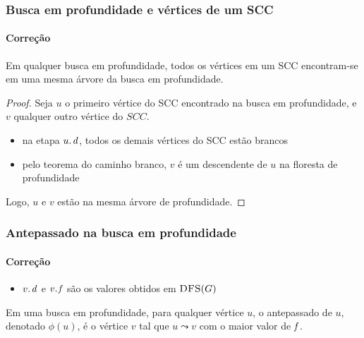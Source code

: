 \documentclass{beamer}
\begin{document}

\begin{frame}
\frametitle{Busca em profundidade e vértices de um SCC}
\framesubtitle{Correção}

\begin{theorem}
Em qualquer busca em profundidade, todos os vértices em um SCC
encontram-se em uma mesma árvore da busca em profundidade.
\end{theorem}
\pause
\begin{proof}
Seja $u$ o primeiro vértice do SCC encontrado na busca em profundidade,
e $v$ qualquer outro vértice do $SCC$.
\begin{itemize}
\item na etapa $\attrib{u}{d}$, todos os demais vértices do SCC estão brancos
\item pelo teorema do caminho branco, $v$ é um descendente de $u$ na floresta
de profundidade
\end{itemize}
Logo, $u$ e $v$ estão na mesma árvore de profundidade.
\end{proof}
\end{frame}

\begin{frame}
\frametitle{Antepassado na busca em profundidade}
\framesubtitle{Correção}

\begin{itemize}
\item $\attrib{v}{d}$ e $\attrib{v}{f}$ são os valores obtidos em $\textnormal{\scshape DFS}(G)$
\end{itemize}

\begin{definition}
Em uma busca em profundidade, para qualquer vértice $u$, o antepassado
de $u$, denotado $\phi(u)$, é o vértice $v$ tal que $u \leadsto v$ com o
maior valor de $\id{f}$.
\end{definition}

\end{frame}
\end{document}
